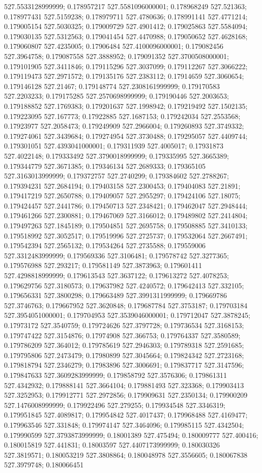 527.5533128999999; 0.178957217 527.5581096000001; 0.178968249 527.521363; 0.178977431 527.5159238; 0.178979711 527.4780636; 0.178991141 527.4771214; 0.179005154 527.5030325; 0.179009729 527.4901412; 0.179025863 527.5584094; 0.179030135 527.5312563; 0.179041454 527.4470988; 0.179050652 527.4628168; 0.179060807 527.4235005; 0.17906484 527.4100096000001; 0.179082456 527.3964758; 0.179087558 527.3888952; 0.179091352 527.3700508000001; 0.179101905 527.3411846; 0.179115296 527.3037099; 0.179112267 527.3066222; 0.179119473 527.2971572; 0.179135176 527.2383112; 0.17914659 527.3060654; 0.179146128 527.21467; 0.179148774 527.2308161999999; 0.179170583 527.2203233; 0.179175285 527.2570698999999; 0.179190446 527.2003653; 0.179188852 527.1769383; 0.179201637 527.1998942; 0.179219492 527.1502135; 0.179223095 527.167773; 0.17922885 527.1687153; 0.179242034 527.2553568; 0.17923977 527.2058473; 0.179249909 527.2966004; 0.179260893 527.3749332; 0.179274061 527.3439684; 0.179274954 527.3730488; 0.179295057 527.4409744; 0.179301051 527.4393041000001; 0.179311939 527.4005017; 0.17931873 527.4022148; 0.179333492 527.3790018999999; 0.179335995 527.3665389; 0.179344779 527.3671385; 0.179346134 527.2689333; 0.179365105 527.3163013999999; 0.179372757 527.2740299; 0.179384602 527.2788267; 0.179394231 527.2684194; 0.179403158 527.2300453; 0.179404083 527.21891; 0.179417219 527.2650788; 0.179409057 527.2955297; 0.179424106 527.18075; 0.179424457 527.2441786; 0.179450713 527.2348421; 0.179462047 527.2948444; 0.179461266 527.2300881; 0.179467069 527.3166012; 0.179489802 527.2414804; 0.179497263 527.1845189; 0.179504851 527.2695758; 0.179508885 527.3410133; 0.179518992 527.3052517; 0.179519996 527.2725737; 0.179532064 527.2667491; 0.179542394 527.2565132; 0.179534264 527.2735588; 0.179559006 527.3312483999999; 0.179569336 527.3106481; 0.179578742 527.3277365; 0.179576988 527.293217; 0.179581149 527.3873963; 0.179601411 527.4298818999999; 0.179613543 527.3637122; 0.179613272 527.4078253; 0.179629756 527.3180573; 0.179637982 527.4240572; 0.179642413 527.332105; 0.179656331 527.3800298; 0.179663489 527.3991311999999; 0.179669786 527.3746763; 0.179667952 527.3620848; 0.179687784 527.3753187; 0.179703184 527.3954051000001; 0.179704953 527.3539046000001; 0.179712047 527.3878245; 0.17973172 527.3540759; 0.179724626 527.3797728; 0.179736534 527.3168153; 0.179747422 527.3154876; 0.17974908 527.366753; 0.179764337 527.3580589; 0.179786209 527.364012; 0.179785619 527.2946303; 0.179789318 527.2591685; 0.179795806 527.2473479; 0.17980899 527.3045664; 0.179824342 527.2723168; 0.179818794 527.2346279; 0.17983896 527.3006691; 0.179837717 527.3147596; 0.179847633 527.3609283999999; 0.179858792 527.3576306; 0.179861311 527.4342932; 0.179888141 527.3664104; 0.179881493 527.323368; 0.179903413 527.3252953; 0.179912771 527.2972856; 0.179909631 527.2350134; 0.179900209 527.1476008999999; 0.179922496 527.279255; 0.179934548 527.3346319; 0.179951845 527.4089817; 0.179954842 527.4017437; 0.179968488 527.4169477; 0.179963546 527.331848; 0.179974147 527.3464096; 0.179985115 527.4342504; 0.179990599 527.3793873999999; 0.18001389 527.475494; 0.180009777 527.400416; 0.180015819 527.441831; 0.18003597 527.4407173999999; 0.180030326 527.3819571; 0.180053219 527.3808864; 0.180048978 527.3556605; 0.180067838 527.3979748; 0.180066451 